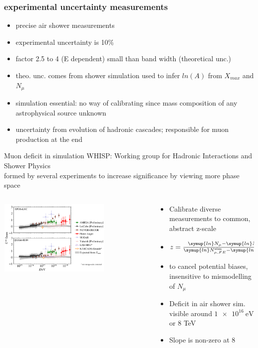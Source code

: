 \documentclass[aspectratio=1610, 9pt]{beamer}
\begin{document}
\begin{frame}\frametitle{experimental uncertainty measurements}
    \begin{itemize}
      \item precise air shower measurements
      \item experimental uncertainty is 10\%
      \item factor 2.5 to 4 (E dependent) small than band width (theoretical unc.)
      \item theo. unc. comes from shower simulation used to infer $ln(A)$ from $X_{max}$ and $N_{\mu}$
      \item simulation essential: no way of calibrating since mass composition of any astrophysical source unknown
      \item uncertainty from evolution of hadronic cascades; responsible for muon production at the end
      \end{itemize}
\end{frame}

\begin{frame}{Muon deficit in simulation}
  WHISP: Working group for Hadronic Interactions and Shower Physics \\
  formed by several experiments to increase significance by viewing more phase space \\
  \begin{columns}
    \begin{column}[c]{0.48\textwidth}
      \includegraphics[width=0.7\textwidth]{z_zmass.png}
    \end{column}
    \begin{column}[c]{0.48\textwidth}
      \begin{itemize}
        \item Calibrate diverse measurements to common, abstract z-scale
        \item $z = \frac{\symup{ln}N_\mu - \symup{ln}N_{\mu,p}^\text{sim}}
        {\symup{ln}N_{\mu,FE}^\text{sim} - \symup{ln}N_{\mu,p}^\text{sim}}$
        \item to cancel potential biases, insensitive to mismodelling of $N_{\mu}$
        \item Deficit in air shower sim. visible around $\SI{1e16}{\electronvolt}$ or 8 TeV
        \item Slope is non-zero at 8\sigma
      \end{itemize}
    \end{column}
  \end{columns}
\end{frame}
\end{document}
